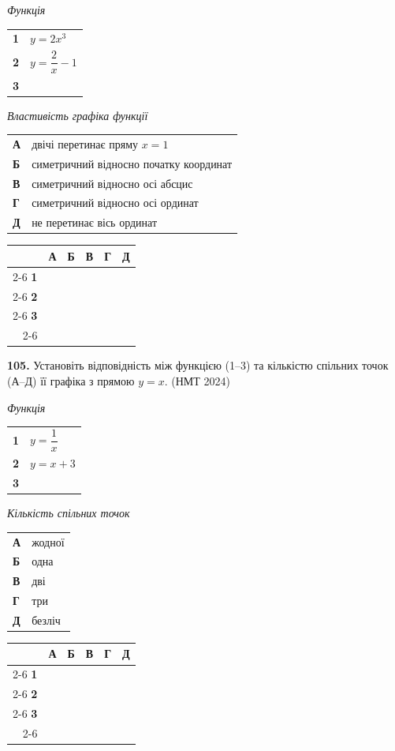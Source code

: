 \documentclass[14pt]{extarticle}
\newcommand{\answerGrid}{
    \begingroup
    \renewcommand{\arraystretch}{1.3} 
    \setlength{\tabcolsep}{7pt} 
    \begin{tabular}{r|c|c|c|c|c|}
         \multicolumn{1}{c}{} & \multicolumn{1}{c}{\textbf{А}} & \multicolumn{1}{c}{\textbf{Б}} & \multicolumn{1}{c}{\textbf{В}} & \multicolumn{1}{c}{\textbf{Г}} & \multicolumn{1}{c}{\textbf{Д}} \\ \cline{2-6}
         \textbf{1} & & & & & \\ \cline{2-6}
         \textbf{2} & & & & & \\ \cline{2-6}
         \textbf{3} & & & & & \\ \cline{2-6}
    \end{tabular}
    \endgroup
}
\newcommand{\matchingLayout}[3]{
    \noindent
    \begin{minipage}[t]{0.40\textwidth}
       
        #1
    \end{minipage}%
    \hfill
    \begin{minipage}[t]{0.28\textwidth}
        
        #2
    \end{minipage}%
    \hfill
    \begin{minipage}[t]{0.30\textwidth}
        \vspace{0pt} %
        \begin{flushright}
        #3
        \end{flushright}
    \end{minipage}
}
\newcommand{\nmtyear}[1]{\hfill{\small\color{yearcolor}(НМТ #1)}}
\begin{document}
\matchingLayout{
    \textit{Функція} \par \vspace{0.2cm}
    \begin{tabular}{@{}p{0.5cm} l@{}}
    \textbf{1} & $y=2x^3$ \\[0.4cm]
    \textbf{2} & $y=\dfrac{2}{x}-1$ \\[0.4cm]
    \textbf{3} & \trigStyle{$y=\cos x$} \\
    \end{tabular}
}{
    \textit{Властивість графіка функції} \par \vspace{0.2cm}
    \begin{tabular}{@{}p{0.5cm} p{7cm}@{}}
    \textbf{А} & двічі перетинає пряму $x=1$ \\[0.2cm]
    \textbf{Б} & симетричний відносно початку координат \\[0.2cm]
    \textbf{В} & симетричний відносно осі абсцис \\[0.2cm]
    \textbf{Г} & симетричний відносно осі ординат \\[0.2cm]
    \textbf{Д} & не перетинає вісь ординат \\
    \end{tabular}
}{
    \answerGrid
}

\vspace{0.7cm}


\noindent\textbf{105.} Установіть відповідність між функцією (1--3) та кількістю спільних точок (А--Д) її графіка з прямою $y=x$. \nmtyear{2024}

\vspace{0.3cm}

\matchingLayout{
    \textit{Функція} \par \vspace{0.2cm}
    \begin{tabular}{@{}p{0.5cm} l@{}}
    \textbf{1} & $y=\dfrac{1}{x}$ \\[0.6cm]
    \textbf{2} & $y=x+3$ \\[0.4cm]
    \textbf{3} & \trigStyle{$y=\operatorname{tg} x$} \\
    \end{tabular}
}{
    \textit{Кількість спільних точок} \par \vspace{0.2cm}
    \begin{tabular}{@{}p{0.5cm} l@{}}
    \textbf{А} & жодної \\[0.2cm]
    \textbf{Б} & одна \\[0.2cm]
    \textbf{В} & дві \\[0.2cm]
    \textbf{Г} & три \\[0.2cm]
    \textbf{Д} & безліч \\
    \end{tabular}
}{
    \answerGrid
}
\end{document}
